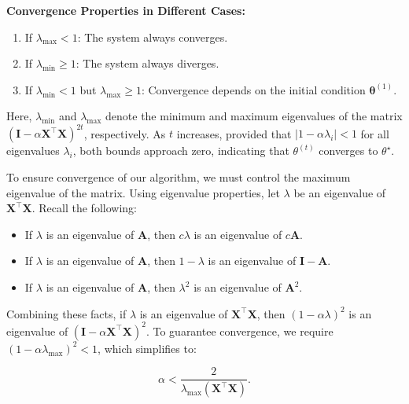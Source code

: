 \textbf{Convergence Properties in Different Cases:}
\begin{enumerate}
    \item If \(\lambda_{\max} < 1\): The system always converges.
    \item If \(\lambda_{\min} \geq 1\): The system always diverges.
    \item If \(\lambda_{\min} < 1\) but \(\lambda_{\max} \geq 1\): Convergence depends on the initial condition \(\boldsymbol{\theta}^{(1)}\).
\end{enumerate}



Here, \(\lambda_{\min}\) and \(\lambda_{\max}\) denote the minimum and maximum eigenvalues of the matrix \((\mathbf{I} - \alpha \boldsymbol{X}^\top \boldsymbol{X})^{2t}\), respectively. As \(t\) increases, provided that \(|1 - \alpha \lambda_i| < 1\) for all eigenvalues \(\lambda_i\), both bounds approach zero, indicating that \(\theta^{(t)}\) converges to \(\theta^\star\).


To ensure convergence of our algorithm, we must control the maximum eigenvalue of the matrix. Using eigenvalue properties, let \(\lambda\) be an eigenvalue of \(\mathbf{X}^\top \mathbf{X}\). Recall the following:
\begin{itemize}
    \item If \(\lambda\) is an eigenvalue of \(\mathbf{A}\), then \(c\lambda\) is an eigenvalue of \(c\mathbf{A}\).
    \item If \(\lambda\) is an eigenvalue of \(\mathbf{A}\), then \(1 - \lambda\) is an eigenvalue of \(\mathbf{I} - \mathbf{A}\).
    \item If \(\lambda\) is an eigenvalue of \(\mathbf{A}\), then \(\lambda^2\) is an eigenvalue of \(\mathbf{A}^2\).
\end{itemize}

Combining these facts, if \(\lambda\) is an eigenvalue of \(\mathbf{X}^\top \mathbf{X}\), then \((1 - \alpha \lambda)^2\) is an eigenvalue of \((\mathbf{I} - \alpha \mathbf{X}^\top \mathbf{X})^2\). To guarantee convergence, we require \((1 - \alpha \lambda_{\max})^2 < 1\), which simplifies to:

\[
\alpha < \frac{2}{\lambda_{\max}(\mathbf{X}^\top \mathbf{X})}.
\]
